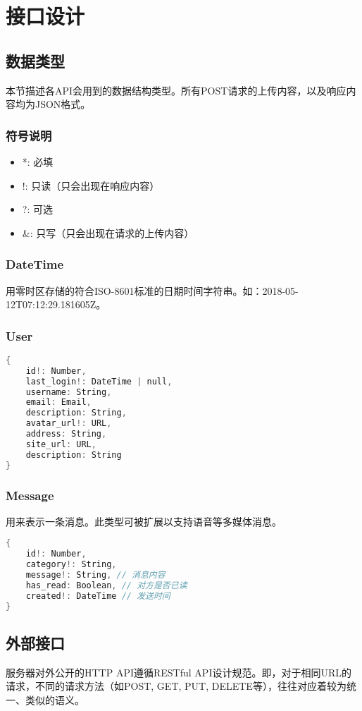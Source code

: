 \chapter{接口设计}
\section{数据类型}
本节描述各API会用到的数据结构类型。所有POST请求的上传内容，以及响应内容均为JSON格式。
\subsection{符号说明}
\begin{itemize}
    \item  *: 必填
    \item  !: 只读（只会出现在响应内容）
    \item  ?: 可选
    \item  \&: 只写（只会出现在请求的上传内容）
\end{itemize}
\subsection{DateTime}
用零时区存储的符合ISO-8601标准的日期时间字符串。如：2018-05-12T07:12:29.181605Z。
\subsection{User}
\begin{lstlisting}[language=C]
{
    id!: Number,
    last_login!: DateTime | null,
    username: String,
    email: Email,
    description: String,
    avatar_url!: URL,
    address: String,
    site_url: URL,
    description: String
}
\end{lstlisting}
\subsection{Message}
用来表示一条消息。此类型可被扩展以支持语音等多媒体消息。
\begin{lstlisting}[language=C]
{
    id!: Number,
    category!: String,
    message!: String, // 消息内容
    has_read: Boolean, // 对方是否已读
    created!: DateTime // 发送时间
}
\end{lstlisting}


\section{外部接口}
服务器对外公开的HTTP API遵循RESTful API设计规范。即，对于相同URL的请求，不同的请求方法（如POST, GET, PUT, DELETE等），往往对应着较为统一、类似的语义。

